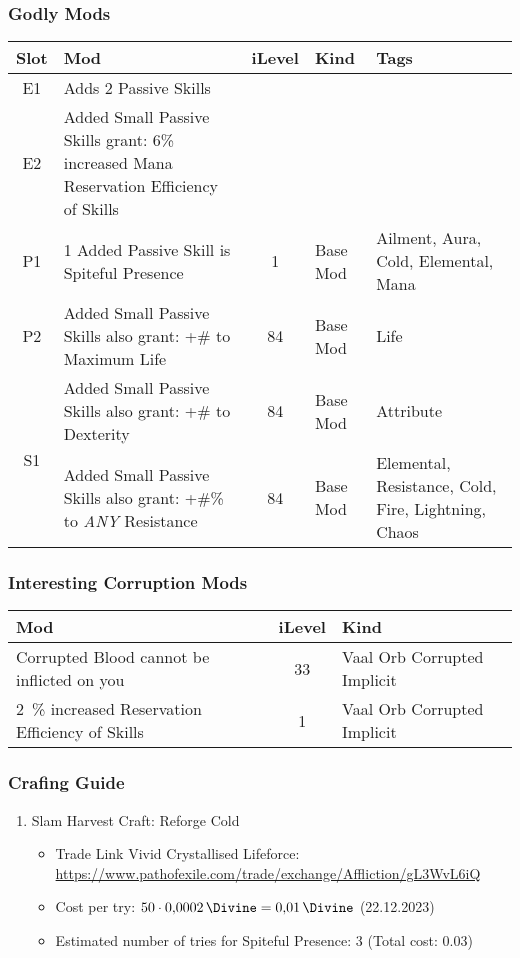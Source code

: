 \subsubsection{Godly Mods}
\begin{tabular}{|c|l|c|l|l|}
	\hline
	Slot&Mod&iLevel&Kind&Tags\\\hline
	E1& Adds 2 Passive Skills&&&\\\hline
	E2& Added Small Passive Skills grant: 6\% increased Mana Reservation Efficiency of Skills&&& \\\hline
	P1& 1 Added Passive Skill is Spiteful Presence&1& Base Mod& Ailment, Aura, Cold, Elemental, Mana\\\hline
	P2& Added Small Passive Skills also grant: +\# to Maximum Life&84& Base Mod& Life \\\hline
	\multirow{2}{*}{S1}&Added Small Passive Skills also grant: +\# to Dexterity&84& Base Mod& Attribute \\\cline{2-4}
	&Added Small Passive Skills also grant: +\#\% to \emph{ANY} Resistance&84&Base Mod& Elemental, Resistance, Cold, Fire, Lightning, Chaos\\\hline
\end{tabular}

\subsubsection{Interesting Corruption Mods}
\begin{tabular}{|l|c|l|}
	\hline
	Mod&iLevel&Kind\\\hline
	Corrupted Blood cannot be inflicted on you&33& Vaal Orb Corrupted Implicit \\\hline
	\SI{2}{\percent} increased Reservation Efficiency of Skills&1& Vaal Orb Corrupted Implicit \\\hline
\end{tabular}

\subsubsection{Crafing Guide}
\begin{enumerate}
	\item Slam Harvest Craft: Reforge Cold
	\begin{itemize}
		\item Trade Link Vivid Crystallised Lifeforce: \url{https://www.pathofexile.com/trade/exchange/Affliction/gL3WvL6iQ}
		\item Cost per try: $50\cdot\SI{0.0002}{\Divine} = \SI{0.01}{\Divine}$ (22.12.2023)
		\item Estimated number of tries for Spiteful Presence: 3 (Total cost: \SI{0.03}{\Divine})
	\end{itemize}
\end{enumerate}

